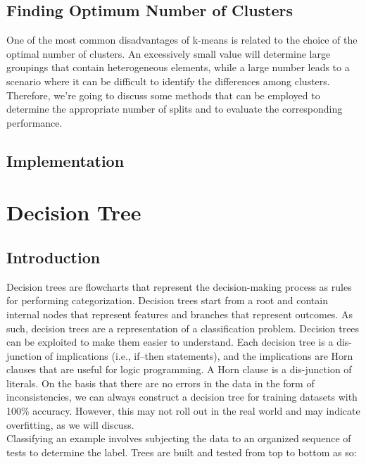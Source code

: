 \documentclass[12pt]{article}
\begin{document}
\subsection{Finding Optimum Number of Clusters}
One of the most common disadvantages of k-means is related to the choice of the optimal number of clusters. An excessively small value will determine large groupings that contain heterogeneous elements, while a large number leads to a scenario where it can be difficult to identify the differences among clusters. Therefore, we're going to discuss some methods that can be employed to determine the appropriate number of splits and to evaluate the corresponding performance.

\subsection{Implementation}

 
\lstset{style=mystyle}




\newpage
\section{Decision Tree}
\subsection{Introduction}
Decision trees are flowcharts that represent the decision-making process as rules for performing categorization. Decision trees start from a root and contain internal nodes that represent features and branches that represent outcomes. As such, decision trees are a representation of a classification problem. Decision trees can be exploited to make them easier to understand. Each decision tree is a dis-junction of implications (i.e., if–then statements), and the implications are Horn clauses that are useful for logic programming. A Horn clause is a dis-junction of literals.
On the basis that there are no errors in the data in the form of inconsistencies, we can always construct a decision tree for training datasets with 100\% accuracy. However, this may not roll out in the real world and may indicate overfitting, as we will discuss.
\\
Classifying an example involves subjecting the data to an organized sequence of tests to determine the label. Trees are built and tested from top to bottom as so:
\end{document}
